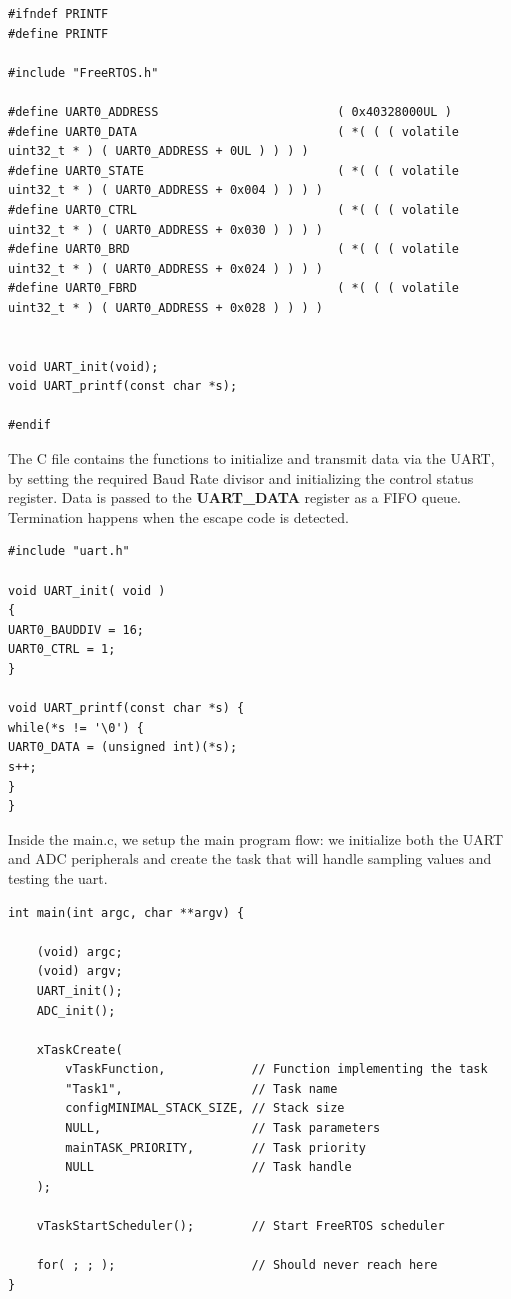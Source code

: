 \documentclass{article}
\begin{document}
\begin{verbatim}
#ifndef PRINTF
#define PRINTF

#include "FreeRTOS.h"

#define UART0_ADDRESS                         ( 0x40328000UL )
#define UART0_DATA                            ( *( ( ( volatile uint32_t * ) ( UART0_ADDRESS + 0UL ) ) ) )
#define UART0_STATE                           ( *( ( ( volatile uint32_t * ) ( UART0_ADDRESS + 0x004 ) ) ) )
#define UART0_CTRL                            ( *( ( ( volatile uint32_t * ) ( UART0_ADDRESS + 0x030 ) ) ) )
#define UART0_BRD                             ( *( ( ( volatile uint32_t * ) ( UART0_ADDRESS + 0x024 ) ) ) )
#define UART0_FBRD                            ( *( ( ( volatile uint32_t * ) ( UART0_ADDRESS + 0x028 ) ) ) )


void UART_init(void);
void UART_printf(const char *s);

#endif
\end{verbatim}

The C file contains the functions to initialize and transmit data via the UART, by setting the required Baud Rate divisor and initializing the control status register. Data is passed to the \textbf{UART\_DATA} register as a FIFO queue. Termination happens when the escape code is detected.


\begin{verbatim}
#include "uart.h"

void UART_init( void )
{
UART0_BAUDDIV = 16;
UART0_CTRL = 1;
}

void UART_printf(const char *s) {
while(*s != '\0') {
UART0_DATA = (unsigned int)(*s);
s++;
}
}
\end{verbatim}






Inside the main.c, we setup the main program flow: we initialize both the UART and ADC peripherals and create the task that will handle sampling values and testing the uart.






\begin{verbatim}
int main(int argc, char **argv) {

    (void) argc;
    (void) argv;
    UART_init();
    ADC_init();

    xTaskCreate(
        vTaskFunction,            // Function implementing the task
        "Task1",                  // Task name
        configMINIMAL_STACK_SIZE, // Stack size
        NULL,                     // Task parameters
        mainTASK_PRIORITY,        // Task priority
        NULL                      // Task handle
    );

    vTaskStartScheduler();        // Start FreeRTOS scheduler

    for( ; ; );                   // Should never reach here
}
\end{verbatim}
\end{document}
